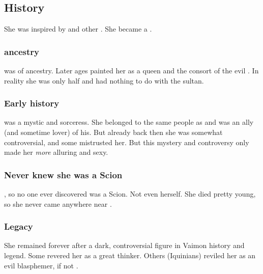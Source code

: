 \subsection{History}
She was inspired by  and other \qliphoth. 
She became a . 





\subsubsection{\Sarun ancestry}
\Delphine was of  ancestry.
Later ages painted her as a \Sarun queen and the consort of the evil . 
In reality she was only half \Sarun and had nothing to do with the sultan.





\subsubsection{Early history}
\Delphine{} was a mystic and sorceress. 
She belonged to the same people as  and was an ally (and sometime lover) of his. 
But already back then she was somewhat controversial, and some mistrusted her. 
But this mystery and controversy only made her \emph{more} alluring and sexy. 





\subsubsection{Never knew she was a Scion}
, so no one ever discovered \Delphine{} was a Scion. 
Not even \Delphine{} herself. 
She died pretty young, so she never came anywhere near \Apotheosis. 





\subsubsection{Legacy}
She remained forever after a dark, controversial figure in Vaimon history and legend. 
Some revered her as a great thinker. 
Others (Iquinians) reviled her as an evil blasphemer, if not . 

